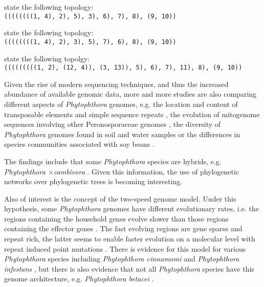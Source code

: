  state the following topology:\\
\texttt{((((((((1, 4), 2), 5), 3), 6), 7), 8), (9, 10))}\cite{kroonGenusPhytophthoraAnno2012}

 state the following topology:\\
\texttt{((((((((1, 4), 2), 3), 5), 7), 6), 8), (9, 10))}\cite{yangExpandedPhylogenyGenus2017}

 state the following topolgy:\\
\texttt{(((((((((1, 2), (12, 4)), (3, 13)), 5), 6), 7), 11), 8), (9, 10))}\cite{abadPhytophthoraTaxonomicPhylogenetic2023a}


Given the rise of modern sequencing techniques, and thus the increased abundance
of available genomic data, more and more studies are also comparing different
aspects of \textit{Phytophthora} genomes, e.g. the location and content of
transposable elements and simple sequence repeats
\cite{mandalComparativeGenomeAnalysis2022}, the evolution of mitogenome
sequences involving other Peronosporaceae genomes
\cite{winkworthComparativeAnalysesComplete2022}, the diversity of
\textit{Phytophthora} genomes found in soil and water samples
\cite{catalaUseGenusSpecificAmplicon2015} or the differences in species
communities associated with soy beans
\cite{navarroComparisonSpeciesCommunities2021}.

The findings include that some \textit{Phytophthora} species are
hybrids, e.g. \textit{Phytophthora $\times$cambivora}
\cite{jungSixNewPhytophthora2017,vanpouckeUnravellingHybridizationPhytophthora2021}.
Given this information, the use of phylogenetic networks over phylogenetic trees
is becoming interesting. 

Also of interest is the concept of the two-speed genome model. Under this
hypothesis, some \textit{Phytophthora} genomes have different evolutionary
rates, i.e. the regions containing the household genes evolve slower than those
regions containing the effector genes \cite{dongTwospeedGenomesFilamentous2015}.
The fast evolving regions are gene sparse and repeat rich, the latter seems to
enable faster evolution on a molecular level with repeat induced point mutations
\cite{dongTwospeedGenomesFilamentous2015}. There is evidence for this model for
various \textit{Phytophthora} species including \textit{Phytophthora cinnamomi}
\cite{engelbrechtGenomeDestructiveOomycete2021} and \textit{Phytophthora
infestans} \cite{ayala-usmaWholeGenomeDuplication2021,dongTwospeedGenomesFilamentous2015},
but there is also evidence that not all \textit{Phytophthora} species have this
genome architecture, e.g. \textit{Phytophthora betacei}
\cite{ayala-usmaWholeGenomeDuplication2021}.

